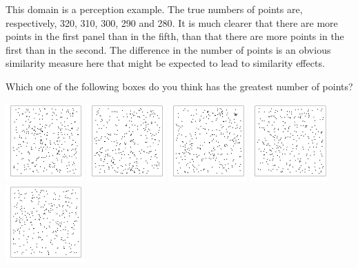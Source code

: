 
This domain is a perception example.
The true numbers of points are, respectively, 320, 310, 300, 290 and 280.
It is much clearer that there are more points in the first panel than in the fifth, than that there are more points in the first than in the second.
The difference in the number of points is an obvious similarity measure here that might be expected to lead to similarity effects.
{}
\begin{tcolorbox}
Which one of the following boxes do you think has the greatest number of points?

\includegraphics[height=3cm]{Population_study_design/Scatterplots1.pdf}
\includegraphics[height=3cm]{Population_study_design/Scatterplots2.pdf}
\includegraphics[height=3cm]{Population_study_design/Scatterplots3.pdf}
\includegraphics[height=3cm]{Population_study_design/Scatterplots4.pdf}
\includegraphics[height=3cm]{Population_study_design/Scatterplots5.pdf}
\end{tcolorbox}
